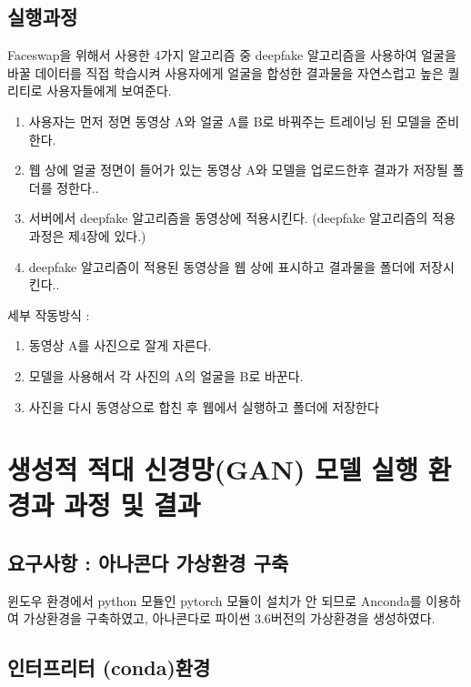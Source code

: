 \documentclass[chapter,oneside]{oblivoir}
\begin{document}
\subsection{실행과정}

Faceswap을 위해서 사용한 4가지 알고리즘 중 deepfake 알고리즘을 사용하여 얼굴을 바꿀 데이터를 직접 학습시켜 사용자에게 얼굴을 합성한 결과물을 자연스럽고 높은 퀄리티로 사용자들에게 보여준다.

\begin{enumerate}
    \item  사용자는 먼저 정면 동영상 A와 얼굴 A를 B로 바꿔주는 트레이닝 된 모델을 준비한다.
    \item 웹 상에 얼굴 정면이 들어가 있는 동영상 A와 모델을 업로드한후 결과가 저장될 폴더를 정한다..
    \item 서버에서 deepfake 알고리즘을 동영상에 적용시킨다.  (deepfake 알고리즘의 적용과정은 제4장에 있다.)
    \item deepfake 알고리즘이 적용된 동영상을 웹 상에 표시하고 결과물을 폴더에 저장시킨다..
\end{enumerate}

세부 작동방식 :

\begin{enumerate}
    \item  동영상 A를 사진으로 잘게 자른다. 
    \item  모델을 사용해서 각 사진의 A의 얼굴을 B로 바꾼다. 
    \item  사진을 다시 동영상으로 합친 후 웹에서 실행하고 폴더에 저장한다
\end{enumerate}

\section{생성적 적대 신경망(GAN) 모델 실행 환경과 과정 및 결과}

\subsection{요구사항 : 아나콘다 가상환경 구축}


윈도우 환경에서 python 모듈인 pytorch 모듈이 설치가 안 되므로 Anconda를 이용하여 가상환경을 구축하였고, 아나콘다로 파이썬 3.6버전의 가상환경을 생성하였다.

\subsection{인터프리터 (conda)환경}
\end{document}

